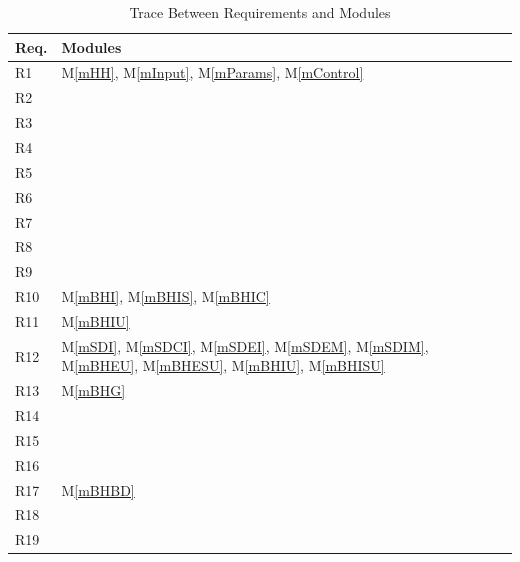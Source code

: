 \documentclass[12pt, titlepage]{article}
\newcommand{\mref}[1]{M\ref{#1}}
\begin{document}
\begin{table}[H]
\centering
\begin{tabular}{p{} p{}}
\toprule
\textbf{Req.} & \textbf{Modules}\\
\midrule
R1 & \mref{mHH}, \mref{mInput}, \mref{mParams}, \mref{mControl}\\
R2 &  \\
R3 &  \\
R4 &  \\
R5 &  \\
R6 &  \\
R7 &  \\
R8 &  \\
R9 &  \\
R10 & \mref{mBHI}, \mref{mBHIS},  \mref{mBHIC}  \\
R11 & \mref{mBHIU} \\
R12 & \mref{mSDI}, \mref{mSDCI}, \mref{mSDEI}, \mref{mSDEM}, \mref{mSDIM}, \mref{mBHEU}, \mref{mBHESU}, \mref{mBHIU}, \mref{mBHISU}\\
R13 &  \mref{mBHG}\\ 
R14 &  \\
R15 &  \\
R16 &  \\
R17 &  \mref{mBHBD}\\ 
R18 &  \\
R19 &  \\
\bottomrule
\end{tabular}
\caption{Trace Between Requirements and Modules}
\label{TblRT}
\end{table}
\end{document}
